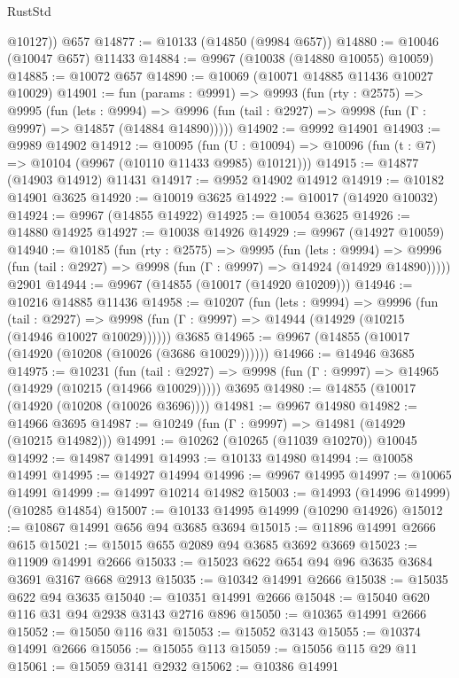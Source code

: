 \begin{lexlean}{RustStd}
\begin{coremodule}
{\begin{coremodule}
{{{{{{{{{{{{{{{{{{{{{{{{{{{{{{{{{{{{{{{{{{{{{{{{{{{{{{{{{{{{{{{{{{{{{{{{{{{{{{        @10127))
    @657
@14877 := @10133 (@14850 (@9984 @657))
@14880 := @10046 (@10047 @657) @11433
@14884 := @9967 (@10038 (@14880 @10055) @10059)
@14885 := @10072 @657
@14890 := @10069 (@10071 @14885 @11436 @10027 @10029)
@14901 := fun (params : @9991) =>
  @9993
    (fun (rty : @2575) =>
    @9995
      (fun (lets : @9994) =>
      @9996 (fun (tail : @2927) => @9998 (fun (Γ : @9997) => @14857 (@14884 @14890)))))
@14902 := @9992 @14901
@14903 := @9989 @14902
@14912 := @10095
    (fun (U : @10094) => @10096 (fun (t : @7) => @10104 (@9967 (@10110 @11433 @9985) @10121)))
@14915 := @14877 (@14903 @14912) @11431
@14917 := @9952 @14902 @14912
@14919 := @10182 @14901 @3625
@14920 := @10019 @3625
@14922 := @10017 (@14920 @10032)
@14924 := @9967 (@14855 @14922)
@14925 := @10054 @3625
@14926 := @14880 @14925
@14927 := @10038 @14926
@14929 := @9967 (@14927 @10059)
@14940 := @10185
    (fun (rty : @2575) =>
    @9995
      (fun (lets : @9994) =>
      @9996 (fun (tail : @2927) => @9998 (fun (Γ : @9997) => @14924 (@14929 @14890)))))
    @2901
@14944 := @9967 (@14855 (@10017 (@14920 @10209)))
@14946 := @10216 @14885 @11436
@14958 := @10207
    (fun (lets : @9994) =>
    @9996
      (fun (tail : @2927) =>
      @9998 (fun (Γ : @9997) => @14944 (@14929 (@10215 (@14946 @10027 @10029))))))
    @3685
@14965 := @9967 (@14855 (@10017 (@14920 (@10208 (@10026 (@3686 @10029))))))
@14966 := @14946 @3685
@14975 := @10231
    (fun (tail : @2927) => @9998 (fun (Γ : @9997) => @14965 (@14929 (@10215 (@14966 @10029)))))
    @3695
@14980 := @14855 (@10017 (@14920 (@10208 (@10026 @3696))))
@14981 := @9967 @14980
@14982 := @14966 @3695
@14987 := @10249 (fun (Γ : @9997) => @14981 (@14929 (@10215 @14982)))
@14991 := @10262 (@10265 (@11039 @10270)) @10045
@14992 := @14987 @14991
@14993 := @10133 @14980
@14994 := @10058 @14991
@14995 := @14927 @14994
@14996 := @9967 @14995
@14997 := @10065 @14991
@14999 := @14997 @10214 @14982
@15003 := @14993 (@14996 @14999) (@10285 @14854)
@15007 := @10133 @14995 @14999 (@10290 @14926)
@15012 := @10867 @14991 @656 @94 @3685 @3694
@15015 := @11896 @14991 @2666 @615
@15021 := @15015 @655 @2089 @94 @3685 @3692 @3669
@15023 := @11909 @14991 @2666
@15033 := @15023 @622 @654 @94 @96 @3635 @3684 @3691 @3167 @668 @2913
@15035 := @10342 @14991 @2666
@15038 := @15035 @622 @94 @3635
@15040 := @10351 @14991 @2666
@15048 := @15040 @620 @116 @31 @94 @2938 @3143 @2716 @896
@15050 := @10365 @14991 @2666
@15052 := @15050 @116 @31
@15053 := @15052 @3143
@15055 := @10374 @14991 @2666
@15056 := @15055 @113
@15059 := @15056 @115 @29 @11
@15061 := @15059 @3141 @2932
@15062 := @10386 @14991
}}}}}}}}}}}}}}}}}}}}}}}}}}}}}}}}}}}}}}}}}}}}}}}}}}}}}}}}}}}}}}}}}}}}}}}}}}}}}}
\end{coremodule}}
\end{coremodule}
\end{lexlean}
